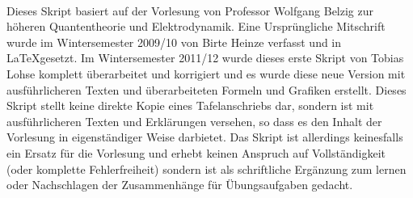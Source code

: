 



\thispagestyle{empty} 
\maketitle
\thispagestyle{empty}
\newpage
\thispagestyle{empty}
$\;$
\newpage 
\thispagestyle{empty}
$\;$\vspace{3cm}
\par\begingroup\leftskip=3.5cm\rightskip=3.5cm
Dieses Skript basiert auf der Vorlesung von Professor Wolfgang Belzig zur höheren Quantentheorie und Elektrodynamik. Eine Ursprüngliche Mitschrift wurde im Wintersemester 2009/10 von Birte Heinze verfasst und in \LaTeX gesetzt. Im Wintersemester 2011/12 wurde dieses erste Skript von Tobias Lohse komplett überarbeitet und korrigiert und es wurde diese neue Version mit ausführlicheren Texten und überarbeiteten Formeln und Grafiken erstellt. Dieses Skript stellt keine direkte Kopie eines Tafelanschriebs dar, sondern ist mit ausführlicheren Texten und Erklärungen versehen, so dass es den Inhalt der Vorlesung in eigenständiger Weise darbietet. Das Skript ist allerdings keinesfalls ein Ersatz für die Vorlesung und erhebt keinen Anspruch auf Vollständigkeit (oder komplette Fehlerfreiheit) sondern ist als schriftliche Ergänzung zum lernen oder Nachschlagen der Zusammenhänge für Übungsaufgaben gedacht.
\par\endgroup 
\newpage 

\setcounter{page}{1}
\thispagestyle{plain}
\tableofcontents
\cleardoublepage 

\pagestyle{fancy}

\thispagestyle{plain}  \newpage 
\thispagestyle{plain}
\thispagestyle{plain}  \newpage 
\thispagestyle{plain}  \newpage
\thispagestyle{plain}  \newpage 
\thispagestyle{plain}  \newpage
\thispagestyle{plain}  \newpage
\thispagestyle{plain}  \newpage
\setcounter{equation}{0}
\setcounter{section}{1}
\thispagestyle{plain} 
\thispagestyle{plain}  \newpage
\thispagestyle{plain}  \newpage
\thispagestyle{plain}  \newpage
\thispagestyle{plain}  \newpage
\setcounter{section}{2}
\setcounter{equation}{0}
\thispagestyle{plain} 
\thispagestyle{plain}  \newpage
\thispagestyle{plain}  \newpage
\thispagestyle{plain}  \newpage
\setcounter{section}{3}
\setcounter{equation}{0}
\thispagestyle{plain} 
\thispagestyle{plain}  \newpage
\thispagestyle{plain}  \newpage
\thispagestyle{plain}  \newpage
\thispagestyle{plain}  \newpage
\thispagestyle{plain}  \newpage
\thispagestyle{plain}  \newpage
\setcounter{section}{4}
\setcounter{equation}{0}
\cleardoublepage



 
